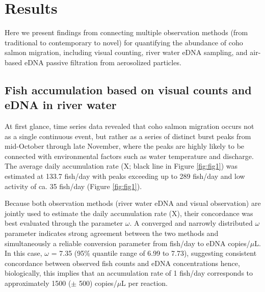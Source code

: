 \documentclass{article}
\begin{document}
\clearpage
\section{Results}
Here we present findings from connecting multiple observation methods (from traditional to contemporary to novel) for quantifying the abundance of coho salmon migration, including visual counting, river water eDNA sampling, and air-based eDNA passive filtration from aerosolized particles.

\subsection{Fish accumulation based on visual counts and eDNA in river water}
At first glance, time series data revealed that coho salmon migration occurs not as a single continuous event, but rather as a series of distinct burst peaks from mid-October through late November, where the peaks are highly likely to be connected with environmental factors such as water temperature and discharge. The average daily accumulation rate (X; black line in Figure \ref{fig:fig1}) was estimated at 133.7 fish/day with peaks exceeding up to 289 fish/day and low activity of ca. 35 fish/day (Figure \ref{fig:fig1}).


Because both observation methods (river water eDNA and visual observation) are jointly used to estimate the daily accumulation rate (X), their concordance was best evaluated through the parameter $\omega$. A converged and narrowly distributed $\omega$ parameter indicates strong agreement between the two methods and simultaneously a reliable conversion parameter from fish/day to eDNA copies/$\mu$L. In this case, $\omega$ = 7.35 (95\% quantile range of 6.99 to 7.73), suggesting consistent concordance between observed fish counts and eDNA concentrations hence, biologically, this implies that an accumulation rate of 1 fish/day corresponds to approximately 1500 ($\pm$ 500) copies/$\mu$L per reaction.
\end{document}
